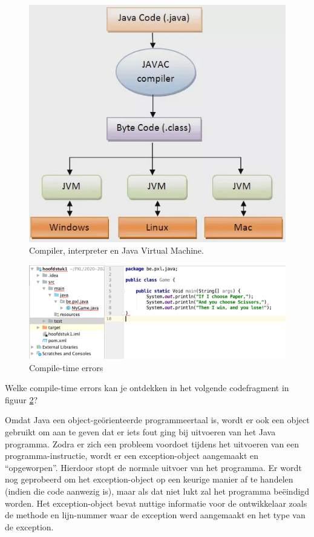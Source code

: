 \begin{figure}[H]
  \includegraphics[width=\linewidth]{images/h1/java_compiler.jpeg}
  \caption{Compiler, interpreter en Java Virtual Machine.}
  \label{fig:compiler}
\end{figure}


\begin{figure}[H]
  \includegraphics[width=\linewidth]{images/h1/compiletime_errors.png}
  \caption{Compile-time errors}
  \label{fig:compiletime_errors}
\end{figure}

\begin{oefening}
Welke compile-time errors kan je ontdekken in het volgende codefragment in figuur \ref{fig:compiletime_errors}?
\end{oefening}

Omdat Java een object-ge\"orienteerde programmeertaal is, wordt er ook een object gebruikt om aan te geven dat er iets fout ging bij uitvoeren van het Java programma. Zodra er zich een probleem voordoet tijdens het uitvoeren van een programma-instructie, wordt er een exception-object aangemaakt en ``opgeworpen''. Hierdoor stopt de normale uitvoer van het programma. Er wordt nog geprobeerd om het exception-object op een keurige manier af te handelen (indien die code aanwezig is), maar als dat niet lukt zal het programma be\"eindigd worden. Het exception-object bevat nuttige informatie voor de ontwikkelaar zoals de methode en lijn-nummer waar de exception werd aangemaakt en het type van de exception. 

